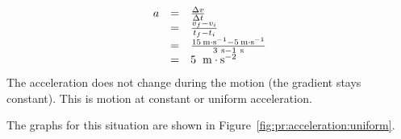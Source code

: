     \begin{equation*}
    \begin{array}{ccc}\hfill a& =& \frac{\Delta v}{\Delta t}\hfill \\ & =& \frac{{v}_{f}-{v}_{i}}{{t}_{f}-{t}_{i}}\hfill \\ & =& \frac{15\phantom{\rule{0.166667em}{0ex}}\text{m}\ensuremath{\cdot}{\text{s}}^{-1}-5\phantom{\rule{0.166667em}{0ex}}\text{m}\ensuremath{\cdot}{\text{s}}^{-1}}{3\phantom{\rule{3.33333pt}{0ex}}\text{s}-1\phantom{\rule{3.33333pt}{0ex}}\text{s}}\hfill \\ & =& 5\phantom{\rule{4pt}{0ex}}\phantom{\rule{0.166667em}{0ex}}\text{m}\ensuremath{\cdot}{\text{s}}^{-2}\hfill \end{array}
      \end{equation*}
        \label{m38795*id72716}The acceleration does not change during the motion (the gradient stays constant). This is motion at constant or uniform acceleration.\par 
        \label{m38795*id72723}The graphs for this situation are shown in Figure~\ref{fig:pr:acceleration:uniform}.\par 
    \setcounter{subfigure}{0}
